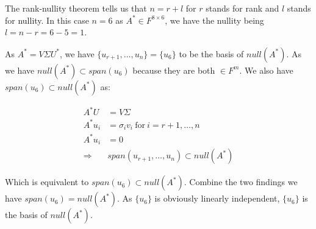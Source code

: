 \documentclass[11pt]{article}
\begin{document}
The rank-nullity theorem tells us that $n = r + l$ for $r$ stands for rank and $l$ stands for nullity. In this case $n = 6$ as $A^* \in F^{8 \times 6}$, we have the nullity being $l = n - r = 6 - 5 = 1$.

As $A^* = V \Sigma U^*$, we have $\{u_{r+1}, \dots, u_n \} = \{u_6 \}$ to be the basis of $null(A^*)$. As we have $null(A^*) \subset span(u_6)$ because they are both $\in F^m$. We also have $span(u_6) \subset null(A^*)$ as:

\begin{align*}
    A^* U &= V \Sigma \\
    A^* u_i &= \sigma_i v_i \ \text{for} \ i = r+1, \dots, n\\
    A^* u_i &= 0 \\
    \Longrightarrow& span(u_{r+1}, \dots, u_n) \subset null(A^*)
\end{align*}

Which is equivalent to $span(u_6) \subset null(A^*)$. Combine the two findings we have $span(u_6) = null(A^*)$. As $\{u_6 \}$ is obviously linearly independent, $\{u_6 \}$  is the basis of $null(A^*)$.
\end{document}
